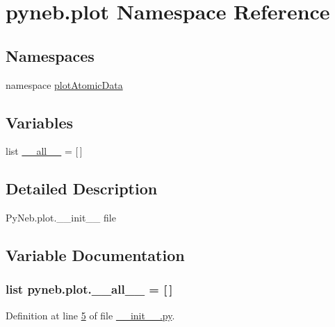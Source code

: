 \hypertarget{namespacepyneb_1_1plot}{\section{pyneb.\-plot Namespace Reference}
\label{namespacepyneb_1_1plot}
}
\subsection*{Namespaces}
\begin{DoxyCompactItemize}
\item 
namespace \hyperlink{namespacepyneb_1_1plot_1_1plot_atomic_data}{plot\-Atomic\-Data}
\end{DoxyCompactItemize}
\subsection*{Variables}
\begin{DoxyCompactItemize}
\item 
list \hyperlink{namespacepyneb_1_1plot_a66a8860c2cc0db67a520645120e8bc7b}{\-\_\-\-\_\-all\-\_\-\-\_\-} = \mbox{[}$\,$\mbox{]}
\end{DoxyCompactItemize}


\subsection{Detailed Description}
\begin{DoxyVerb}PyNeb.plot.__init__ file\end{DoxyVerb}
 

\subsection{Variable Documentation}
\hypertarget{namespacepyneb_1_1plot_a66a8860c2cc0db67a520645120e8bc7b}{
\subsubsection[{\-\_\-\-\_\-all\-\_\-\-\_\-}]{\setlength{\rightskip}{0pt plus 5cm}list pyneb.\-plot.\-\_\-\-\_\-all\-\_\-\-\_\- = \mbox{[}$\,$\mbox{]}}}\label{namespacepyneb_1_1plot_a66a8860c2cc0db67a520645120e8bc7b}


Definition at line \hyperlink{plot_2____init_____8py_source_l00005}{5} of file \hyperlink{plot_2____init_____8py_source}{\-\_\-\-\_\-init\-\_\-\-\_\-.\-py}.

